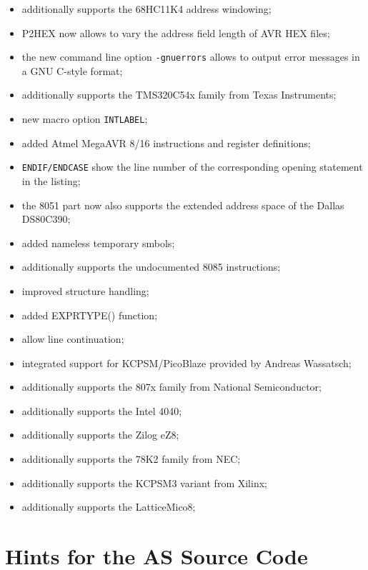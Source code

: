 \documentclass[12pt,twoside]{report}
\begin{document}
\begin{itemize}
{\begin{itemize}
      \item{additionally supports the 68HC11K4 address windowing;}
      \item{P2HEX now allows to vary the address field length of AVR HEX
            files;}
      \item{the new command line option {\tt -gnuerrors} allows to output 
            error messages in a GNU C-style format;}
      \item{additionally supports the TMS320C54x family from Texas
            Instruments;}
      \item{new macro option {\tt INTLABEL};}
      \item{added Atmel MegaAVR 8/16 instructions and register
            definitions;}
      \item{{\tt ENDIF/ENDCASE} show the line number of the corresponding
            opening statement in the listing;}
      \item{the 8051 part now also supports the extended address space of
            the Dallas DS80C390;}
      \item{added nameless temporary smbols;}
      \item{additionally supports the undocumented 8085 instructions;}
      \item{improved structure handling;}
      \item{added EXPRTYPE() function;}
      \item{allow line continuation;}
      \item{integrated support for KCPSM/PicoBlaze provided by Andreas
            Wassatsch;}
      \item{additionally supports the 807x family from National
            Semiconductor;}
      \item{additionally supports the Intel 4040;}
      \item{additionally supports the Zilog eZ8;}
      \item{additionally supports the 78K2 family from NEC;}
      \item{additionally supports the KCPSM3 variant from Xilinx;}
      \item{additionally supports the LatticeMico8;}
      \end{itemize}}
\end{itemize}


\cleardoublepage
\chapter{Hints for the AS Source Code}
\label{ChapSource}
\end{document}
